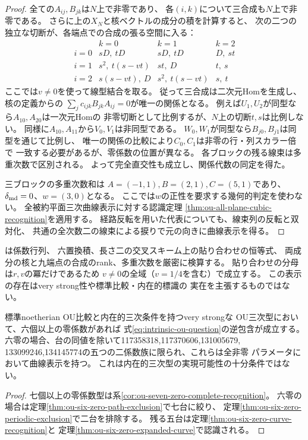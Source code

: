 \begin{proof}
全ての$A_{ij},B_{jk}$は$N$上で非零であり、
各$(i,k)$について三合成も$N$上で非零である。
さらに上の$X_N$と核ベクトルの成分の積を計算すると、
次の二つの独立な切断が、各端点での合成の張る空間に入る：
\[
 \begin{array}{c|ccc}
 &k=0&k=1&k=2\\ \hline
 i=0&sD,\ tD&sD,\ tD&D,\ st\\
 i=1&s^2,\ t(s-vt)&st,\ D&t,\ s\\
 i=2&s(s-vt),\ D&s^2,\ t(s-vt)&s,\ t
 \end{array}
\]
ここでは$v\ne0$を使って線型結合を取る。
従って三合成は二次元Homを生成し、核の定義からの
$\sum_j c_{ijk}B_{jk}A_{ij}=0$が唯一の関係となる。
例えば$U_1,U_2$が同型なら$A_{10},A_{20}$は一次元Homの
非零切断として比例するが、$N$上の切断$t,s$は比例しない。
同様に$A_{10},A_{11}$から$V_0,V_1$は非同型である。
$W_0,W_1$が同型なら$B_{j0},B_{j1}$は同型を通じて比例し、
唯一の関係の比較により$C_0,C_1$は非零の行・列スカラー倍で
一致する必要があるが、零係数の位置が異なる。
各ブロックの残る線束は多重次数で区別される。
よって完全直交性も成立し、関係代数の同定を得た。

三ブロックの多重次数和は
$A=(-1,1), B=(2,1), C=(5,1)$であり、
$\delta_{\rm md}=0$、$w=(3,0)$となる。
ここでは$w$の正性を要求する幾何的判定を使わない。
全被約平面三次曲線表示に対する認識定理
\ref{thm:ou-all-plane-cubic-recognition}を適用する。
経路反転を用いた代表についても、線束列の反転と双対化、
共通の全次数二の線束による捩りで元の向きに曲線表示を得る。
\end{proof}

\begin{remark}
は係数行列、
六置換積、長さ二の交叉スキーム上の貼り合わせの恒等式、
両成分の核と九端点の合成のrank、多重次数を厳密に検算する。
貼り合わせの分母は$r,v$の冪だけであるため
$v\ne0$の全域（$v=1/4$を含む）で成立する。
この表示の存在はvery strong性や標準比較・内在的標識の
実在を主張するものではない。
\end{remark}

\begin{corollary}
\label{cor:ou-six-zero-complete-recognition}
標準noetherian OU比較と内在的三次条件を持つvery strongな
OU三次型において、六個以上の零係数があれば
式\eqref{eq:intrinsic-ou-question}の逆包含が成立する。
六零の場合、台の同値を除いて117358318,117370606,131005679,
133099246,134145774の五つの二係数族に限られ、これらは全非零
パラメータにおいて曲線表示を持つ。
これは内在的三次型の実現可能性の十分条件ではない。
\end{corollary}
\begin{proof}
七個以上の零係数型は系\ref{cor:ou-seven-zero-complete-recognition}。
六零の場合は定理\ref{thm:ou-six-zero-path-exclusion}で七台に絞り、
定理\ref{thm:ou-six-zero-periodic-exclusion}で二台を排除する。
残る五台は定理\ref{thm:ou-six-zero-curve-recognition}と
定理\ref{thm:ou-six-zero-expanded-curve}で認識される。
\end{proof}


